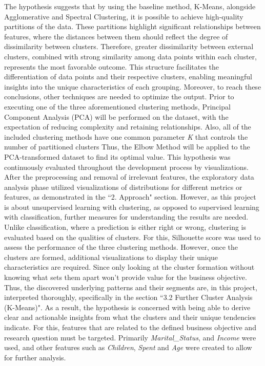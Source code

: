 \documentclass[11pt]{article}
\begin{document}
The hypothesis suggests that by using the baseline method, K-Means, alongside Agglomerative and Spectral Clustering, it is possible to achieve high-quality partitions of the data. These partitions highlight significant relationships between features, where the distances between them should reflect the degree of dissimilarity between clusters. Therefore, greater dissimilarity between external clusters, combined with strong similarity among data points within each cluster, represents the most favorable outcome. This structure facilitates the differentiation of data points and their respective clusters, enabling meaningful insights into the unique characteristics of each grouping. Moreover, to reach these conclusions, other techniques are needed to optimize the output. Prior to executing one of the three aforementioned clustering methods, Principal Component Analysis (PCA) will be performed on the dataset, with the expectation of reducing complexity and retaining relationships. Also, all of the included clustering methods have one common parameter \textit{K} that controls the number of partitioned clusters Thus, the Elbow Method will be applied to the PCA-transformed dataset to find its optimal value. This hypothesis was continuously evaluated throughout the development process by visualizations. After the preprocessing and removal of irrelevant features, the exploratory data analysis phase utilized visualizations of distributions for different metrics or features, as demonstrated in the ``2. Approach" section. However, as this project is about unsupervised learning with clustering, as opposed to supervised learning with classification, further measures for understanding the results are needed. Unlike classification, where a prediction is either right or wrong, clustering is evaluated based on the qualities of clusters. For this, Silhouette score was used to assess the performance of the three clustering methods. However, once the clusters are formed, additional visualizations to display their unique characteristics are required. Since only looking at the cluster formation without knowing what sets them apart won’t provide value for the business objective. Thus, the discovered underlying patterns and their segments are, in this project, interpreted thoroughly, specifically in the section ``3.2 Further Cluster Analysis (K-Means)". As a result, the hypothesis is concerned with being able to derive clear and actionable insights from what the clusters and their unique tendencies indicate. For this, features that are related to the defined business objective and research question must be targeted. Primarily \textit{Marital\_Status}, and \textit{Income} were used, and other features such as \textit{Children}, \textit{Spent} and \textit{Age} were created to allow for further analysis.
\end{document}
